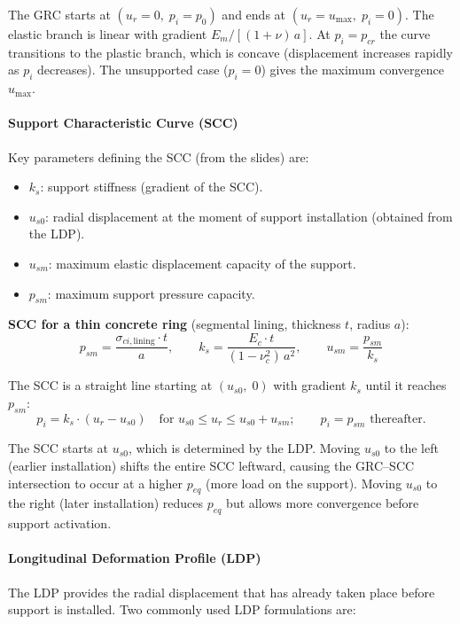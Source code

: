 \begin{notebox}
The GRC starts at $(u_r=0,\; p_i=p_0)$ and ends at $(u_r=u_{\max},\; p_i=0)$. The elastic branch is linear with gradient $E_m/[(1+\nu)\,a]$. At $p_i = p_{cr}$ the curve transitions to the plastic branch, which is concave (displacement increases rapidly as $p_i$ decreases). The unsupported case ($p_i = 0$) gives the maximum convergence $u_{\max}$.
\end{notebox}

\paragraph{Support Characteristic Curve (SCC)}
Key parameters defining the SCC (from the slides) are:
\begin{itemize}
 \item $k_s$: support stiffness (gradient of the SCC).
 \item $u_{s0}$: radial displacement at the moment of support installation (obtained from the LDP).
 \item $u_{sm}$: maximum elastic displacement capacity of the support.
 \item $p_{sm}$: maximum support pressure capacity.
\end{itemize}

\textbf{SCC for a thin concrete ring} (segmental lining, thickness $t$, radius $a$):
\[
p_{sm} = \frac{\sigma_{ci,\text{lining}} \cdot t}{a}, \qquad
k_s = \frac{E_c \cdot t}{(1-\nu_c^2)\,a^2}, \qquad
u_{sm} = \frac{p_{sm}}{k_s}
\]

The SCC is a straight line starting at $(u_{s0},\; 0)$ with gradient $k_s$ until it reaches $p_{sm}$:
\[
p_i = k_s \cdot (u_r - u_{s0}) \quad \text{for } u_{s0} \leq u_r \leq u_{s0}+u_{sm}; \qquad p_i = p_{sm} \text{ thereafter.}
\]

\begin{warnbox}
The SCC starts at $u_{s0}$, which is determined by the LDP. Moving $u_{s0}$ to the left (earlier installation) shifts the entire SCC leftward, causing the GRC--SCC intersection to occur at a higher $p_{eq}$ (more load on the support). Moving $u_{s0}$ to the right (later installation) reduces $p_{eq}$ but allows more convergence before support activation.
\end{warnbox}

\paragraph{Longitudinal Deformation Profile (LDP)}
The LDP provides the radial displacement that has already taken place before support is installed. Two commonly used LDP formulations are:

